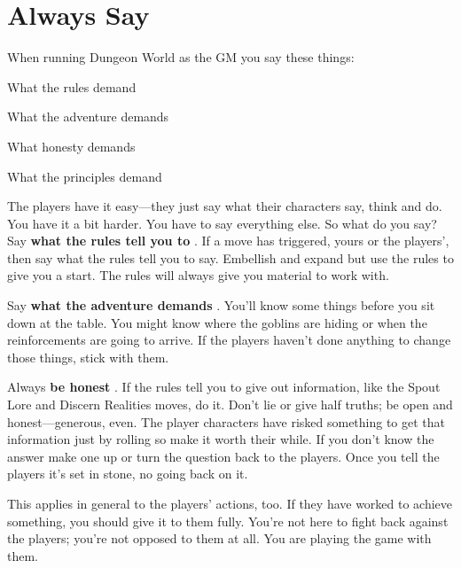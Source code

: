  
\section{Always Say}  
 

When running Dungeon World as the GM you say these things:

 
\startitemize[1,packed]

\item What the rules demand

 
\item What the adventure demands

 
\item What honesty demands

 
\item What the principles demand


\stopitemize
 

The players have it easy—they just say what their characters say, think and do. You have it a bit harder. You have to say everything else. So what do you say? Say {\bf what the rules tell you to} . If a move has triggered, yours or the players', then say what the rules tell you to say. Embellish and expand but use the rules to give you a start. The rules will always give you material to work with.

 

Say {\bf what the adventure demands} . You'll know some things before you sit down at the table. You might know where the goblins are hiding or when the reinforcements are going to arrive. If the players haven't done anything to change those things, stick with them.

 

Always {\bf be honest} . If the rules tell you to give out information, like the Spout Lore and Discern Realities moves, do it. Don't lie or give half truths; be open and honest—generous, even. The player characters have risked something to get that information just by rolling so make it worth their while. If you don't know the answer make one up or turn the question back to the players. Once you tell the players it's set in stone, no going back on it.

 

This applies in general to the players' actions, too. If they have worked to achieve something, you should give it to them fully. You're not here to fight back against the players; you're not opposed to them at all. You are playing the game with them.

 

